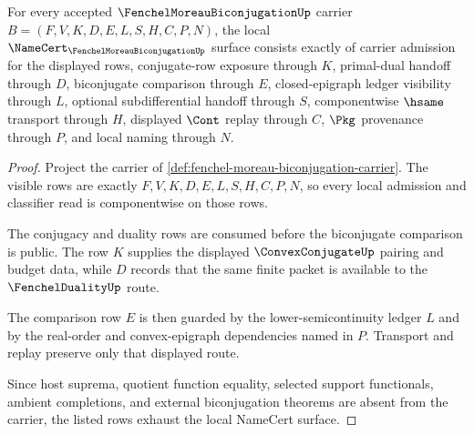 \begin{theorem}
\label{thm:fenchel-moreau-biconjugation-namecert-obligations}
For every accepted $\FenchelMoreauBiconjugationUp$ carrier $B=(F,V,K,D,E,L,S,H,C,P,N)$, the local $\NameCert_{\FenchelMoreauBiconjugationUp}$ surface consists exactly of carrier admission for the displayed rows, conjugate-row exposure through $K$, primal-dual handoff through $D$, biconjugate comparison through $E$, closed-epigraph ledger visibility through $L$, optional subdifferential handoff through $S$, componentwise $\hsame$ transport through $H$, displayed $\Cont$ replay through $C$, $\Pkg$ provenance through $P$, and local naming through $N$.
\end{theorem}
\begin{proof}
Project the carrier of \autoref{def:fenchel-moreau-biconjugation-carrier}. The visible rows are exactly $F,V,K,D,E,L,S,H,C,P,N$, so every local admission and classifier read is componentwise on those rows.

The conjugacy and duality rows are consumed before the biconjugate comparison is public. The row $K$ supplies the displayed $\ConvexConjugateUp$ pairing and budget data, while $D$ records that the same finite packet is available to the $\FenchelDualityUp$ route.

The comparison row $E$ is then guarded by the lower-semicontinuity ledger $L$ and by the real-order and convex-epigraph dependencies named in $P$. Transport and replay preserve only that displayed route.

Since host suprema, quotient function equality, selected support functionals, ambient completions, and external biconjugation theorems are absent from the carrier, the listed rows exhaust the local NameCert surface.
\end{proof}

